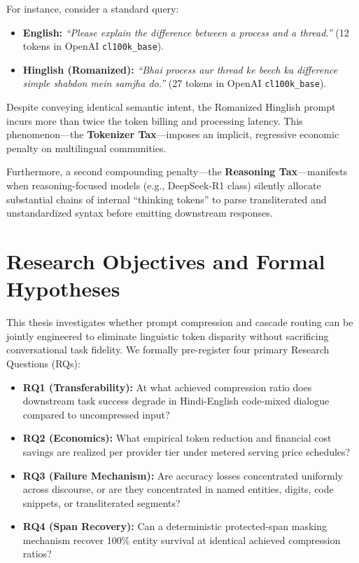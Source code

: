 For instance, consider a standard query:
\begin{itemize}
    \item \textbf{English:} \textit{``Please explain the difference between a process and a thread.''} (12 tokens in OpenAI \texttt{cl100k\_base}).
    \item \textbf{Hinglish (Romanized):} \textit{``Bhai process aur thread ke beech ka difference simple shabdon mein samjha do.''} (27 tokens in OpenAI \texttt{cl100k\_base}).
\end{itemize}

Despite conveying identical semantic intent, the Romanized Hinglish prompt incurs more than twice the token billing and processing latency. This phenomenon—the \textbf{Tokenizer Tax}—imposes an implicit, regressive economic penalty on multilingual communities. 

Furthermore, a second compounding penalty—the \textbf{Reasoning Tax}—manifests when reasoning-focused models (e.g., DeepSeek-R1 class) silently allocate substantial chains of internal ``thinking tokens'' to parse transliterated and unstandardized syntax before emitting downstream responses.

\section{Research Objectives and Formal Hypotheses}
This thesis investigates whether prompt compression and cascade routing can be jointly engineered to eliminate linguistic token disparity without sacrificing conversational task fidelity. We formally pre-register four primary Research Questions (RQs):

\begin{itemize}
    \item \textbf{RQ1 (Transferability):} At what achieved compression ratio does downstream task success degrade in Hindi-English code-mixed dialogue compared to uncompressed input?
    \item \textbf{RQ2 (Economics):} What empirical token reduction and financial cost savings are realized per provider tier under metered serving price schedules?
    \item \textbf{RQ3 (Failure Mechanism):} Are accuracy losses concentrated uniformly across discourse, or are they concentrated in named entities, digits, code snippets, or transliterated segments?
    \item \textbf{RQ4 (Span Recovery):} Can a deterministic protected-span masking mechanism recover 100\% entity survival at identical achieved compression ratios?
\end{itemize}

